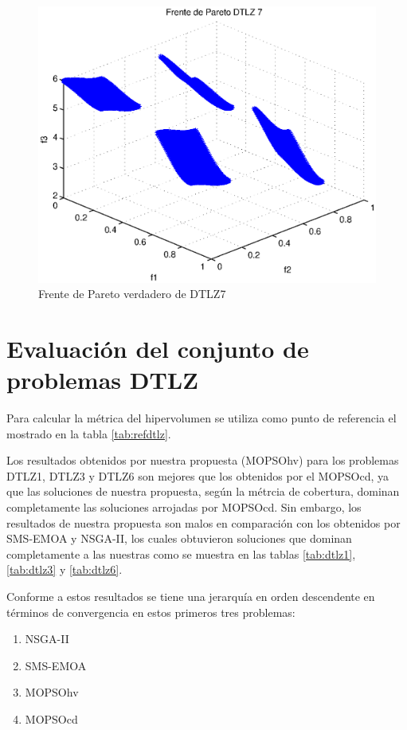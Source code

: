 \begin{figure}
 \centering
    \includegraphics[scale=0.7]{ApendiceA/paretoDTLZ7.eps}
    \caption{Frente de Pareto verdadero de DTLZ7}
    \label{fig:dtlz7}
\end{figure}

\newpage

\section{Evaluaci\'on del conjunto de problemas DTLZ}

Para calcular la m\'etrica del hipervolumen se utiliza como punto de referencia el mostrado en la tabla \ref{tab:refdtlz}.

Los resultados obtenidos por nuestra propuesta (MOPSOhv) para los problemas DTLZ1, DTLZ3 y DTLZ6 son mejores que los obtenidos por el MOPSOcd,
ya que las soluciones de nuestra propuesta, seg\'un la m\'etrcia de cobertura, dominan completamente las soluciones arrojadas por MOPSOcd. 
Sin embargo, los resultados de nuestra propuesta son malos en comparaci\'on con los obtenidos por SMS-EMOA y NSGA-II, los cuales 
obtuvieron soluciones que dominan completamente a las nuestras como se muestra en las tablas \ref{tab:dtlz1}, \ref{tab:dtlz3} y \ref{tab:dtlz6}. 

  Conforme a estos resultados se tiene una jerarqu\'ia en orden descendente en t\'erminos de convergencia en estos primeros tres 
  problemas:

\begin{enumerate}
  \item NSGA-II
  \item SMS-EMOA
  \item MOPSOhv
  \item MOPSOcd
\end{enumerate}

